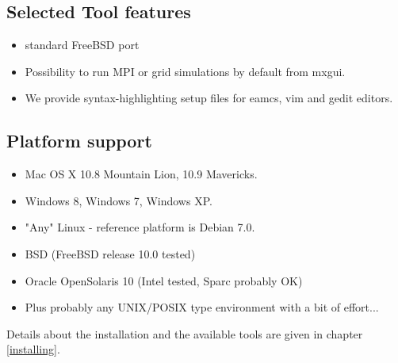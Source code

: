 \subsection{Selected Tool features}
\begin{itemize}
  \item standard FreeBSD port
  \item Possibility to run MPI or grid simulations by default from mxgui.
  \item We provide syntax-highlighting setup files for eamcs, vim and gedit editors.
\end{itemize}
\subsection{Platform support}
\begin{itemize}
\item Mac OS X 10.8 Mountain Lion, 10.9 Mavericks.
\item Windows 8, Windows 7, Windows XP.
\item "Any" Linux - reference platform is Debian 7.0.
\item BSD (FreeBSD release 10.0 tested)
\item Oracle OpenSolaris 10 (Intel tested, Sparc probably OK)
\item Plus probably any UNIX/POSIX type environment with a bit of effort...
\end{itemize}
Details about the installation and the available tools are given in chapter \ref{installing}.


